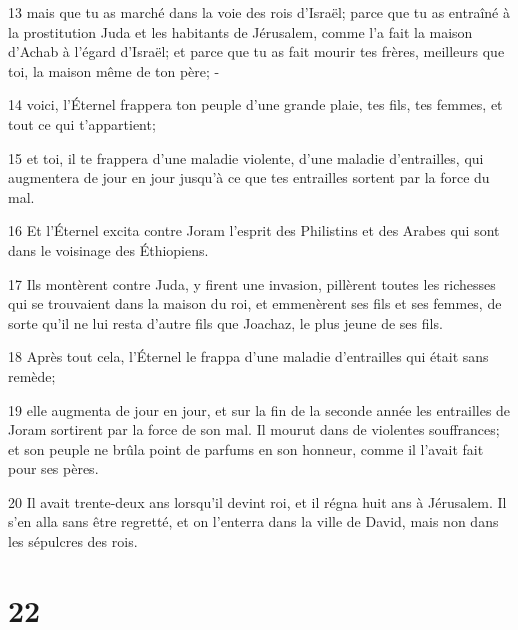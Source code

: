 \par 13 mais que tu as marché dans la voie des rois d'Israël; parce que tu as entraîné à la prostitution Juda et les habitants de Jérusalem, comme l'a fait la maison d'Achab à l'égard d'Israël; et parce que tu as fait mourir tes frères, meilleurs que toi, la maison même de ton père; -
\par 14 voici, l'Éternel frappera ton peuple d'une grande plaie, tes fils, tes femmes, et tout ce qui t'appartient;
\par 15 et toi, il te frappera d'une maladie violente, d'une maladie d'entrailles, qui augmentera de jour en jour jusqu'à ce que tes entrailles sortent par la force du mal.
\par 16 Et l'Éternel excita contre Joram l'esprit des Philistins et des Arabes qui sont dans le voisinage des Éthiopiens.
\par 17 Ils montèrent contre Juda, y firent une invasion, pillèrent toutes les richesses qui se trouvaient dans la maison du roi, et emmenèrent ses fils et ses femmes, de sorte qu'il ne lui resta d'autre fils que Joachaz, le plus jeune de ses fils.
\par 18 Après tout cela, l'Éternel le frappa d'une maladie d'entrailles qui était sans remède;
\par 19 elle augmenta de jour en jour, et sur la fin de la seconde année les entrailles de Joram sortirent par la force de son mal. Il mourut dans de violentes souffrances; et son peuple ne brûla point de parfums en son honneur, comme il l'avait fait pour ses pères.
\par 20 Il avait trente-deux ans lorsqu'il devint roi, et il régna huit ans à Jérusalem. Il s'en alla sans être regretté, et on l'enterra dans la ville de David, mais non dans les sépulcres des rois.

\chapter{22}

